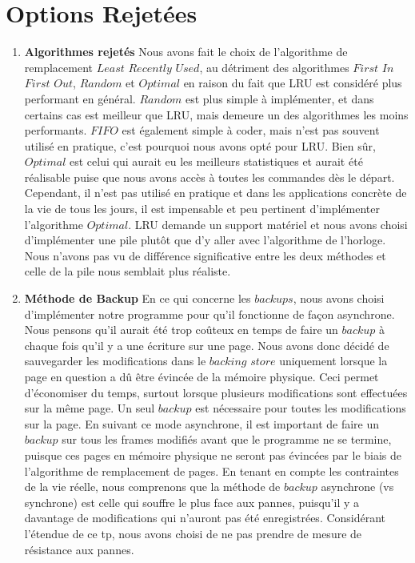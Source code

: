 \documentclass[12pt]{article}
\begin{document}
\section*{Options Rejetées}
\begin{enumerate}
\item \textbf{Algorithmes rejetés}
\newline
Nous avons fait le choix de l'algorithme de remplacement $Least$ $Recently$ $Used$, au détriment des algorithmes $First$ $In$ $First$ $Out$, $Random$ et $Optimal$ en raison du fait que LRU est considéré plus performant en général. $Random$ est plus simple à implémenter, et dans certains cas est meilleur que LRU, mais demeure un des algorithmes les moins performants. $FIFO$ est également simple à coder, mais n'est pas souvent utilisé en pratique, c'est pourquoi nous avons opté pour LRU. Bien sûr, $Optimal$ est celui qui aurait eu les meilleurs statistiques et aurait été réalisable puise que nous avons accès à toutes les commandes dès le départ. Cependant, il n'est pas utilisé en pratique et dans les applications concrète de la vie de tous les jours, il est impensable et peu pertinent d'implémenter l'algorithme $Optimal$. LRU demande un support matériel et nous avons choisi d'implémenter une pile plutôt que d'y aller avec l'algorithme de l'horloge. Nous n'avons pas vu de différence significative entre les deux méthodes et celle de la pile nous semblait plus réaliste. 

\item \textbf{Méthode de Backup}
\newline
En ce qui concerne les $backups$, nous avons choisi d'implémenter notre programme pour qu'il fonctionne de façon asynchrone. Nous pensons qu'il aurait été trop coûteux en temps de faire un $backup$ à chaque fois qu'il y a une écriture sur une page. Nous avons donc décidé de sauvegarder les modifications dans le $backing$ $store$ uniquement lorsque la page en question a dû être évincée de la mémoire physique. Ceci permet d'économiser du temps, surtout lorsque plusieurs modifications sont effectuées sur la même page. Un seul $backup$ est nécessaire pour toutes les modifications sur la page. En suivant ce mode asynchrone, il est important de faire un $backup$ sur tous les frames modifiés avant que le programme ne se termine, puisque ces pages en mémoire physique ne seront pas évincées par le biais de l'algorithme de remplacement de pages. En tenant en compte les contraintes de la vie réelle, nous comprenons que la méthode de $backup$ asynchrone (vs synchrone) est celle qui souffre le plus face aux pannes, puisqu'il y a davantage de modifications qui n'auront pas été enregistrées. Considérant l'étendue de ce tp, nous avons choisi de ne pas prendre de mesure de résistance aux pannes. 

\end{enumerate}
\end{document}
